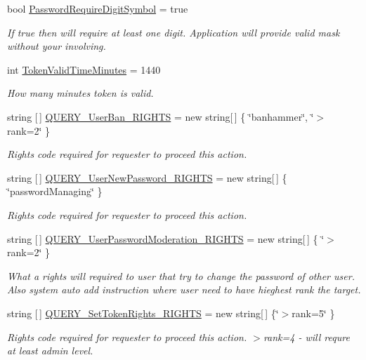 \begin{DoxyCompactItemize}
bool \mbox{\hyperlink{class_authority_controller_1_1_data_1_1_config_a9e5f99e4351d66b2fc56fdafbd4465b9}{Password\+Require\+Digit\+Symbol}} = true
\begin{DoxyCompactList}\small\item\em If true then will require at least one digit. Application will provide valid mask without your involving. \end{DoxyCompactList}\item 
int \mbox{\hyperlink{class_authority_controller_1_1_data_1_1_config_aa0988724b8c2413203508f2819689750}{Token\+Valid\+Time\+Minutes}} = 1440
\begin{DoxyCompactList}\small\item\em How many minutes token is valid. \end{DoxyCompactList}\item 
string \mbox{[}$\,$\mbox{]} \mbox{\hyperlink{class_authority_controller_1_1_data_1_1_config_a5dc14da938c0608904548a2e523dccd1}{Q\+U\+E\+R\+Y\+\_\+\+User\+Ban\+\_\+\+R\+I\+G\+H\+TS}} = new string\mbox{[}$\,$\mbox{]} \{ \char`\"{}banhammer\char`\"{}, \char`\"{}$>$rank=2\char`\"{} \}
\begin{DoxyCompactList}\small\item\em Rights code required for requester to proceed this action. \end{DoxyCompactList}\item 
string \mbox{[}$\,$\mbox{]} \mbox{\hyperlink{class_authority_controller_1_1_data_1_1_config_aebbde34b76e399e76781513058d1aeef}{Q\+U\+E\+R\+Y\+\_\+\+User\+New\+Password\+\_\+\+R\+I\+G\+H\+TS}} = new string\mbox{[}$\,$\mbox{]} \{ \char`\"{}password\+Managing\char`\"{} \}
\begin{DoxyCompactList}\small\item\em Rights code required for requester to proceed this action. \end{DoxyCompactList}\item 
string \mbox{[}$\,$\mbox{]} \mbox{\hyperlink{class_authority_controller_1_1_data_1_1_config_a0d0ef1e3b32d2ae1dfd97cff9b3e6db1}{Q\+U\+E\+R\+Y\+\_\+\+User\+Password\+Moderation\+\_\+\+R\+I\+G\+H\+TS}} = new string\mbox{[}$\,$\mbox{]} \{ \char`\"{}$>$rank=2\char`\"{} \}
\begin{DoxyCompactList}\small\item\em What a rights will required to user that try to change the password of other user. Also system auto add instruction where user need to have hieghest rank the target. \end{DoxyCompactList}\item 
string \mbox{[}$\,$\mbox{]} \mbox{\hyperlink{class_authority_controller_1_1_data_1_1_config_a8f6d78f62fe58dbfaaba5c16d6c420ae}{Q\+U\+E\+R\+Y\+\_\+\+Set\+Token\+Rights\+\_\+\+R\+I\+G\+H\+TS}} = new string\mbox{[}$\,$\mbox{]} \{\char`\"{}$>$rank=5\char`\"{} \}
\begin{DoxyCompactList}\small\item\em Rights code required for requester to proceed this action. $>$rank=4 -\/ will requre at least admin level. \end{DoxyCompactList}\end{DoxyCompactItemize}
